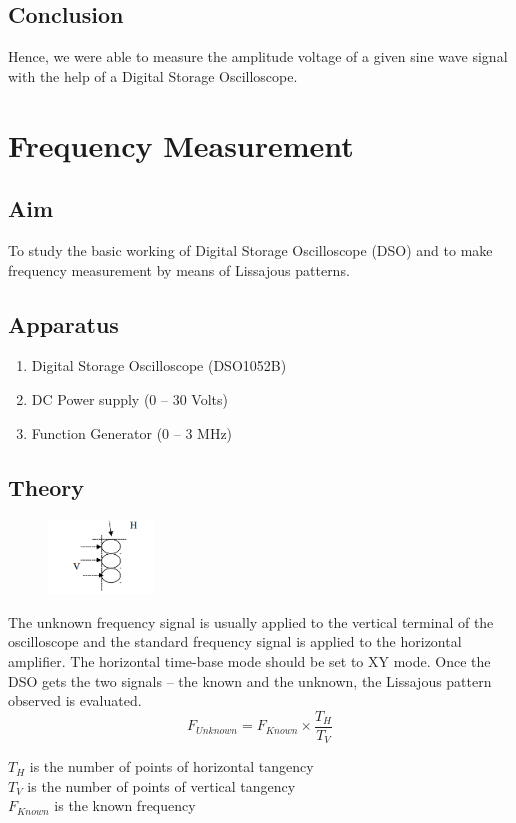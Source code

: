 \documentclass{article}
\begin{document}
\subsection{Conclusion}
Hence, we were able to measure the amplitude voltage of a given sine wave signal
with the help of a Digital Storage Oscilloscope.
\newpage

\section{Frequency Measurement}
\subsection{Aim}
To study the basic working of Digital Storage Oscilloscope (DSO) and to make frequency measurement by means of Lissajous patterns. 

\subsection{Apparatus}
\begin{enumerate}
    \item Digital Storage Oscilloscope (DSO1052B)
    \item DC Power supply (0 – 30 Volts)
    \item Function Generator (0 – 3 MHz)
\end{enumerate}

\subsection{Theory}
\begin{figure}
\includegraphics[width=0.25\textwidth]{2Theory.png}
\end{figure}
The unknown frequency signal is usually applied to the vertical terminal of the
oscilloscope and the standard frequency signal is applied to the horizontal amplifier. The horizontal time-base mode should be set to XY mode. Once the
DSO gets the two signals – the known and the unknown, the Lissajous pattern observed is evaluated.
\begin{equation}
    F_{Unknown}=F_{Known} \times \frac{T_H}{T_V}
\end{equation}
\begin{center}
$T_H$ is the number of points of horizontal tangency \\
$T_V$ is the number of points of vertical tangency \\
$F_{Known}$ is the known frequency\\
\end{center}
\vfill
\end{document}
